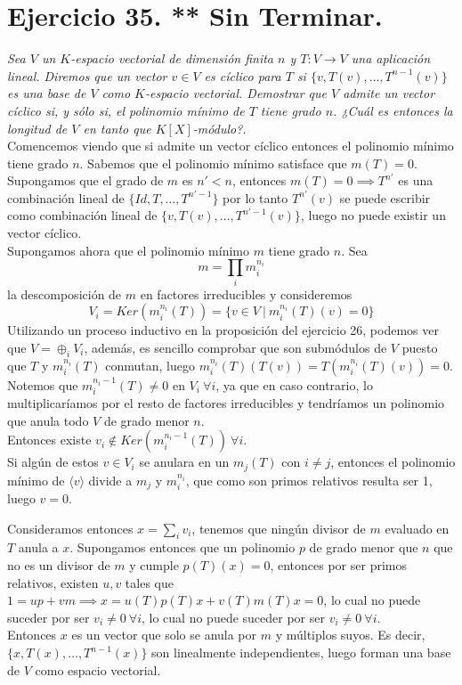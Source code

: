 \section{Ejercicio 35. ** Sin Terminar.} \textit{Sea \(V\) un \(K\)-espacio
  vectorial de dimensión finita \(n\) y \(T:V \to V\) una
  aplicación lineal. Diremos que un vector \(v \in V\) es cíclico para
  \(T\) si \(\{v, T(v), \dots, T^{n-1}(v)\}\) es una base de \(V\)
  como \(K\)-espacio vectorial. Demostrar que \(V\) admite un vector cíclico si,
  y sólo si, el polinomio mínimo de \(T\) tiene grado \(n\). ¿Cuál es entonces
  la longitud de \(V\) en tanto que \(K[X]\)-módulo?.}\\


Comencemos viendo que si admite un vector cíclico entonces el polinomio mínimo
tiene grado \(n\). Sabemos que el polinomio mínimo satisface que \(m(T)=0\). Supongamos que el
grado de \(m\) es \(n' < n\),  entonces \(m(T)=0 \implies T^{n'}\) es una
combinación lineal de \(\{Id,T,\dots,T^{n'-1}\}\) por lo tanto \(T^{n'}(v)\) se
puede escribir como combinación lineal de \(\{v,T(v),\dots,T^{n'-1}(v)\}\),
luego no puede existir un vector cíclico.\\

Supongamos ahora que el polinomio mínimo \(m\) tiene grado \(n\). Sea
\[
  m = \prod_i m_i^{n_i}
\]
la descomposición de \(m\) en factores irreducibles y consideremos
\[
  V_i = Ker(m_i^{n_i}(T)) = \{v \in V \ | \ m_i^{n_i}(T)(v) = 0\}
\]
Utilizando un proceso inductivo en la proposición del ejercicio 26, podemos ver
que \(V = \oplus_i V_i\), además, es sencillo comprobar que son submódulos de \(V\) puesto que \(T\) y \(m_i^{n_i}(T)\)
conmutan, luego \(m_i^{n_i}(T)(T(v)) = T(m_i^{n_i}(T)(v)) = 0\).
Notemos que \(m_i^{n_i - 1}(T) \neq 0\) en \(V_i \ \forall i\), ya que en caso
contrario, lo multiplicaríamos por el resto de factores irreducibles y
tendríamos un polinomio que anula todo \(V\) de grado menor \(n\).\\

Entonces existe \(v_i \not \in Ker(m_i^{n_i-1}(T)) \ \forall i\).\\

Si algún de estos \(v \in V_i\) se anulara en un \(m_j(T)\) con \(i \neq j\),
entonces el polinomio mínimo de \(\langle v \rangle\) divide a \(m_j\) y
\(m_i^{n_i}\), que como son primos relativos resulta ser 1, luego \(v = 0\).

Consideramos entonces \(x = \sum_i v_i\), tenemos que ningún divisor de \(m\)
evaluado en \(T\) anula a \(x\). Supongamos entonces que un polinomio \(p\) de
grado menor que \(n\) que no es un divisor de \(m\) y cumple \(p(T)(x) = 0\),
entonces por ser primos relativos, existen \(u,v\) tales que \(1 = up + vm
\implies x = u(T)p(T)x + v(T)m(T)x = 0 \), lo cual no puede suceder por ser
\(v_i \neq 0 \ \forall i\), lo cual no puede suceder por ser \(v_i \neq 0 \
\forall i\). \\

Entonces \(x\) es un vector que solo se anula
por \(m\) y múltiplos suyos. Es decir, \(\{x, T(x), \dots, T^{n-1}(x)\}\)
son linealmente independientes, luego forman una base de \(V\) como espacio
vectorial.\\
